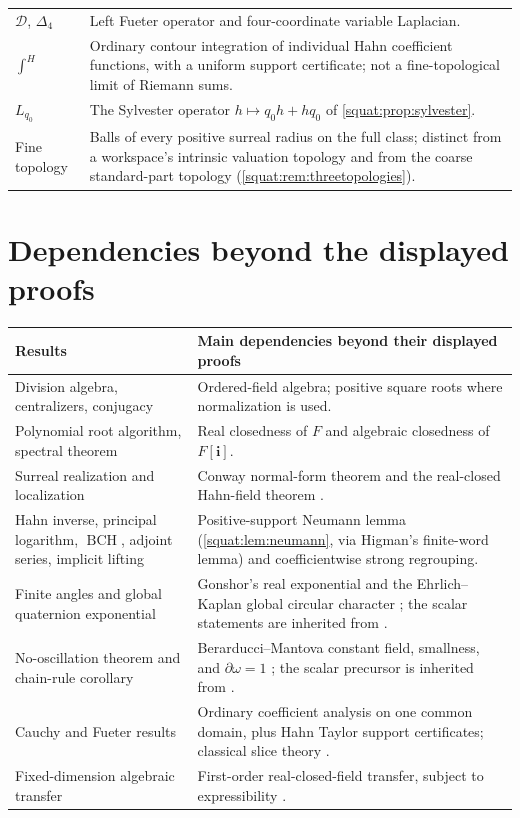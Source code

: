 \documentclass[11pt,letterpaper]{article}
\numberwithin{equation}{section}
\theoremstyle{definition}
\theoremstyle{remark}
\newcommand{\ii}{\mathbf i}
\newcommand{\BCH}{\operatorname{BCH}}
\newcommand{\DD}{\mathcal D}
\begin{document}
\begin{longtable}{L{0.21\textwidth}L{0.71\textwidth}}
$\DD$, $\Delta_4$ & Left Fueter operator and four-coordinate variable Laplacian.\\
$\int^H$ & Ordinary contour integration of individual Hahn coefficient functions, with a
uniform support certificate; not a fine-topological limit of Riemann sums.\\
$L_{q_0}$ & The Sylvester operator $h\mapsto q_0h+hq_0$ of
\cref{squat:prop:sylvester}.\\
Fine topology & Balls of every positive surreal radius on the full class; distinct from a
workspace's intrinsic valuation topology and from the coarse standard-part topology
(\cref{squat:rem:threetopologies}).\\
\end{longtable}
\endgroup

\section{Dependencies beyond the displayed proofs}\label{squat:app:dependencies}

\begin{center}\small
\begin{tabular}{L{0.36\textwidth}L{0.54\textwidth}}
\toprule
Results & Main dependencies beyond their displayed proofs\\
\midrule
Division algebra, centralizers, conjugacy & Ordered-field algebra; positive square roots
where normalization is used.\\
Polynomial root algorithm, spectral theorem & Real closedness of $F$ and algebraic
closedness of $F[\ii]$.\\
Surreal realization and localization & Conway normal-form theorem and the real-closed
Hahn-field theorem \cite{Conway,Alling,EK}.\\
Hahn inverse, principal logarithm, $\BCH$, adjoint series, implicit lifting &
Positive-support Neumann lemma (\cref{squat:lem:neumann}, via Higman's finite-word lemma)
and coefficientwise strong regrouping.\\
Finite angles and global quaternion exponential & Gonshor's real exponential and the
Ehrlich--Kaplan global circular character \cite{Gonshor,EK}; the scalar statements are
inherited from \cite{RepoTrig}.\\
No-oscillation theorem and chain-rule corollary & Berarducci--Mantova constant field,
smallness, and $\partial\omega=1$ \cite{BM}; the scalar precursor is inherited from
\cite{RepoDiff}.\\
Cauchy and Fueter results & Ordinary coefficient analysis on one common domain, plus Hahn
Taylor support certificates; classical slice theory \cite{GP}.\\
Fixed-dimension algebraic transfer & First-order real-closed-field transfer, subject to
expressibility \cite{Swan}.\\
\bottomrule
\end{tabular}
\end{center}
\end{document}
